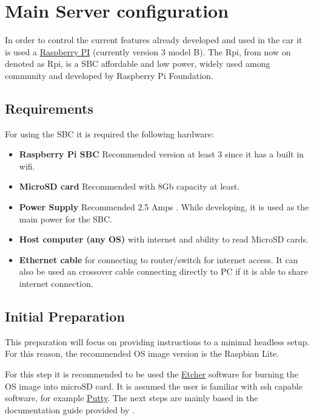 \chapter{Main Server configuration}
\label{chapter:server}

In order to control the current features already developed and used in the car it is used a \href{https://www.raspberrypi.org/products/}{Raspberry PI} (currently version 3 model B). The \acrlong{Rpi}, from now on denoted as \acrshort{Rpi}, is a \gls{SBC} affordable and low power, widely used among community and developed by Raspberry Pi Foundation.

\section{Requirements}
For using the \gls{SBC} it is required the following hardware:
\begin{itemize}
	\item \textbf{Raspberry Pi \gls{SBC}} Recommended version at least 3 since it has a built in wifi.
	\item \textbf{MicroSD card} Recommended with 8Gb capacity at least.
	\item \textbf{Power Supply} Recommended 2.5 Amps . While developing, it is used as the main power for the \gls{SBC}.
	\item \textbf{Host computer (any OS)} with internet and ability to read MicroSD cards.
	\item \textbf{Ethernet cable} for connecting to router/switch for internet access. It can also be used an crossover cable connecting directly to PC if it is able to share internet connection.
\end{itemize}

\section{Initial Preparation}
This preparation will focus on providing instructions to a minimal headless setup. For this reason, the recommended OS image version is the Raspbian Lite.

For this step it is recommended to be used the \href{https://etcher.io/}{Etcher} software for burning the OS image into microSD card. It is assumed the user is familiar with ssh capable software, for example \href{https://www.putty.org/}{Putty}. 
The next steps are mainly based in the documentation guide provided by \cite{raspberry_install_guide}.

